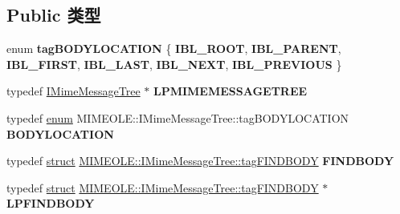\subsection*{Public 类型}
\begin{DoxyCompactItemize}
\item 
\mbox{\label{interface_m_i_m_e_o_l_e_1_1_i_mime_message_tree_abc15f8416b9ca374c203fd44557c6021}} 
enum {\bfseries tag\+B\+O\+D\+Y\+L\+O\+C\+A\+T\+I\+ON} \{ \newline
{\bfseries I\+B\+L\+\_\+\+R\+O\+OT}, 
{\bfseries I\+B\+L\+\_\+\+P\+A\+R\+E\+NT}, 
{\bfseries I\+B\+L\+\_\+\+F\+I\+R\+ST}, 
{\bfseries I\+B\+L\+\_\+\+L\+A\+ST}, 
\newline
{\bfseries I\+B\+L\+\_\+\+N\+E\+XT}, 
{\bfseries I\+B\+L\+\_\+\+P\+R\+E\+V\+I\+O\+US}
 \}
\item 
\mbox{\label{interface_m_i_m_e_o_l_e_1_1_i_mime_message_tree_a7428b047137d502ff5f31fc0133f4a7a}} 
typedef \hyperlink{interface_m_i_m_e_o_l_e_1_1_i_mime_message_tree}{I\+Mime\+Message\+Tree} $\ast$ {\bfseries L\+P\+M\+I\+M\+E\+M\+E\+S\+S\+A\+G\+E\+T\+R\+EE}
\item 
\mbox{\label{interface_m_i_m_e_o_l_e_1_1_i_mime_message_tree_a892f1a4866c1888d22b72120109bc90b}} 
typedef \hyperlink{interfaceenum}{enum} M\+I\+M\+E\+O\+L\+E\+::\+I\+Mime\+Message\+Tree\+::tag\+B\+O\+D\+Y\+L\+O\+C\+A\+T\+I\+ON {\bfseries B\+O\+D\+Y\+L\+O\+C\+A\+T\+I\+ON}
\item 
\mbox{\label{interface_m_i_m_e_o_l_e_1_1_i_mime_message_tree_ab84da48ef0b1518b314d280d80aa6c08}} 
typedef \hyperlink{interfacestruct}{struct} \hyperlink{struct_m_i_m_e_o_l_e_1_1_i_mime_message_tree_1_1tag_f_i_n_d_b_o_d_y}{M\+I\+M\+E\+O\+L\+E\+::\+I\+Mime\+Message\+Tree\+::tag\+F\+I\+N\+D\+B\+O\+DY} {\bfseries F\+I\+N\+D\+B\+O\+DY}
\item 
\mbox{\label{interface_m_i_m_e_o_l_e_1_1_i_mime_message_tree_a1fbc38f15c0f3e2a4bf598afdda18ba8}} 
typedef \hyperlink{interfacestruct}{struct} \hyperlink{struct_m_i_m_e_o_l_e_1_1_i_mime_message_tree_1_1tag_f_i_n_d_b_o_d_y}{M\+I\+M\+E\+O\+L\+E\+::\+I\+Mime\+Message\+Tree\+::tag\+F\+I\+N\+D\+B\+O\+DY} $\ast$ {\bfseries L\+P\+F\+I\+N\+D\+B\+O\+DY}
\end{DoxyCompactItemize}
